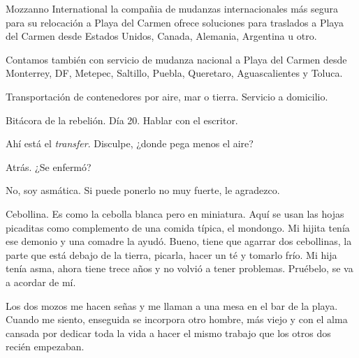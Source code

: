 \documentclass[12pt,twoside,openright,a5paper]{book}
\begin{document}
Mozzanno International la compañia de mudanzas internacionales más segura para
su relocación a Playa del Carmen ofrece soluciones para traslados
a Playa del Carmen desde Estados Unidos, Canada, Alemania, Argentina u otro.

Contamos también con servicio de mudanza nacional a Playa del Carmen desde
Monterrey, DF, Metepec, Saltillo, Puebla, Queretaro, Aguascalientes y Toluca.

Transportación de contenedores por aire, mar o tierra. Servicio a domicilio.


\vspace{0.5cm}
\hrulefill\hspace{0.2cm} \decofourleft\decofourright \hspace{0.2cm} \hrulefill
\vspace{0.5cm}

Bitácora de la rebelión. Día 20. Hablar con el escritor.


\vspace{0.5cm}
\hrulefill\hspace{0.2cm} \decofourleft\decofourright \hspace{0.2cm} \hrulefill
\vspace{0.5cm}

Ahí está el \emph{transfer}. Disculpe, ¿donde pega menos el aire?

Atrás. ¿Se enfermó?

No, soy asmática. Si puede ponerlo no muy fuerte, le agradezco.

Cebollina. Es como la cebolla blanca pero en miniatura. Aquí se usan las
hojas picaditas como complemento de una comida típica, el mondongo. Mi
hijita tenía ese demonio y una comadre la ayudó. Bueno, tiene que agarrar
dos cebollinas, la parte que está debajo de la tierra, picarla, hacer
un té y tomarlo frío. Mi hija tenía asma, ahora tiene trece años y no
volvió a tener problemas. Pruébelo, se va a acordar de mí.


\vspace{0.5cm}
\hrulefill\hspace{0.2cm} \decofourleft\decofourright \hspace{0.2cm} \hrulefill
\vspace{0.5cm}

Los dos mozos me hacen señas y me llaman a una mesa en el bar de la
playa. Cuando me siento, enseguida se incorpora otro hombre, más viejo
y con el alma cansada por dedicar toda la vida a hacer el mismo trabajo
que los otros dos recién empezaban.
\end{document}
